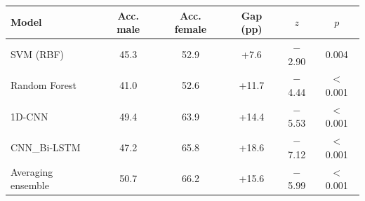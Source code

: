 \begin{tabular}{lccccc}
\toprule
Model & Acc. male & Acc. female & Gap (pp) & $z$ & $p$ \\
\midrule
SVM (RBF) & 45.3 & 52.9 & +7.6 & $-$2.90 & 0.004 \\
Random Forest & 41.0 & 52.6 & +11.7 & $-$4.44 & $<$0.001 \\
1D-CNN & 49.4 & 63.9 & +14.4 & $-$5.53 & $<$0.001 \\
CNN\_Bi-LSTM & 47.2 & 65.8 & +18.6 & $-$7.12 & $<$0.001 \\
Averaging ensemble & 50.7 & 66.2 & +15.6 & $-$5.99 & $<$0.001 \\
\bottomrule
\end{tabular}
